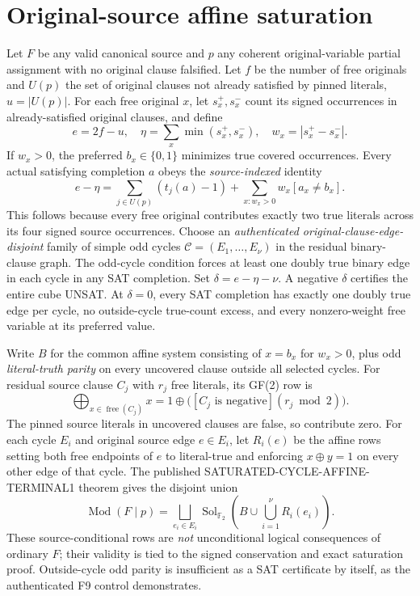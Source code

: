 \documentclass[11pt]{article}
\newcommand{\GF}{\mathbb F_2}
\begin{document}
\section{Original-source affine saturation}
Let $F$ be any valid canonical source and $p$ any coherent original-variable partial assignment with no original clause falsified. Let $f$ be the number of free originals and $U(p)$ the set of original clauses not already satisfied by pinned literals, $u=|U(p)|$. For each free original $x$, let $s_x^+,s_x^-$ count its signed occurrences in already-satisfied original clauses, and define
\[
 e=2f-u,\quad \eta=\sum_x\min(s_x^+,s_x^-),\quad w_x=|s_x^+-s_x^-|.
\]
If $w_x>0$, the preferred $b_x\in\{0,1\}$ minimizes true covered occurrences. Every actual satisfying completion $a$ obeys the \emph{source-indexed} identity
\begin{equation}\label{eq:slack}
 e-\eta=\sum_{j\in U(p)}(t_j(a)-1)+\sum_{x:w_x>0}w_x[a_x\ne b_x].
\end{equation}
This follows because every free original contributes exactly two true literals across its four signed source occurrences. Choose an \emph{authenticated original-clause-edge-disjoint} family of simple odd cycles $\mathcal C=(E_1,\ldots,E_\nu)$ in the residual binary-clause graph. The odd-cycle condition forces at least one doubly true binary edge in each cycle in any SAT completion. Set $\delta=e-\eta-\nu$. A negative $\delta$ certifies the entire cube UNSAT. At $\delta=0$, every SAT completion has exactly one doubly true edge per cycle, no outside-cycle true-count excess, and every nonzero-weight free variable at its preferred value.

Write $B$ for the common affine system consisting of $x=b_x$ for $w_x>0$, plus odd \emph{literal-truth parity} on every uncovered clause outside all selected cycles. For residual source clause $C_j$ with $r_j$ free literals, its GF(2) row is
\[
 \bigoplus_{x\in\operatorname{free}(C_j)}x
 =1\oplus\bigl([C_j\text{ is negative}](r_j\bmod2)\bigr).
\]
The pinned source literals in uncovered clauses are false, so contribute zero. For each cycle $E_i$ and original source edge $e\in E_i$, let $R_i(e)$ be the affine rows setting both free endpoints of $e$ to literal-true and enforcing $x\oplus y=1$ on every other edge of that cycle. The published SATURATED-CYCLE-AFFINE-TERMINAL1 theorem gives the disjoint union
\begin{equation}\label{eq:union}
 \operatorname{Mod}(F\mid p)=\bigsqcup_{e_i\in E_i}\operatorname{Sol}_{\GF}\left(B\cup\bigcup_{i=1}^{\nu}R_i(e_i)\right).
\end{equation}
These source-conditional rows are \emph{not} unconditional logical consequences of ordinary $F$; their validity is tied to the signed conservation and exact saturation proof. Outside-cycle odd parity is insufficient as a SAT certificate by itself, as the authenticated F9 control demonstrates.
\end{document}

